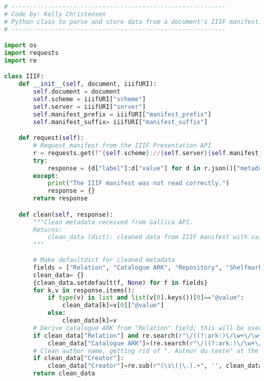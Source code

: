 \documentclass[class=article, crop=false]{standalone}
\begin{document}
\begin{lstlisting}[language=python, style=python]
# -----------------------------------------------------------
# Code by: Kelly Christensen
# Python class to parse and store data from a document's IIIF manifest.
# -----------------------------------------------------------

import os
import requests
import re

class IIIF:
    def __init__(self, document, iiifURI):
        self.document = document
        self.scheme = iiifURI["scheme"]
        self.server = iiifURI["server"]
        self.manifest_prefix = iiifURI["manifest_prefix"]
        self.manifest_suffix= iiifURI["manifest_suffix"]

    def request(self):
        # Request manifest from the IIIF Presentation API
        r = requests.get(f"{self.scheme}://{self.server}{self.manifest_prefix}{os.path.basename(self.document)}{self.manifest_suffix}")
        try:
            response = {d["label"]:d["value"] for d in r.json()["metadata"]}
        except:
            print("The IIIF manifest was not read correctly.")
            response = {}
        return response

    def clean(self, response):
        """Clean metadata received from Gallica API.
        Returns:
            clean_data (dict): cleaned data from IIIF manifest with values == None if not present in API request
        """      
          
        # Make defaultdict for cleaned metadata
        fields = ["Relation", "Catalogue ARK", "Repository", "Shelfmark", "Title", "Language", "Creator", "Date"]
        clean_data= {}
        {clean_data.setdefault(f, None) for f in fields}
        for k,v in response.items():
            if type(v) is list and list(v[0].keys())[0]=="@value":
                clean_data[k]=v[0]["@value"]
            else:
                clean_data[k]=v
        # Derive catalogue ARK from "Relation" field; this will be used to access the BnF's SRU API
        if clean_data["Relation"] and re.search(r"\/((?:ark:)\/\w+\/\w+)", clean_data["Relation"]):
            clean_data["Catalogue ARK"]=(re.search(r"\/((?:ark:)\/\w+\/\w+)", clean_data["Relation"]).group(1))
        # Clean author name, getting rid of ". Auteur du texte" at the end of the string
        if clean_data["Creator"]:
            clean_data["Creator"]=re.sub(r"(\s\(|\.).+", '', clean_data["Creator"])
        return clean_data
\end{lstlisting}
\end{document}
